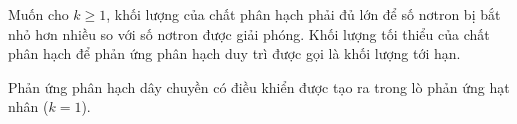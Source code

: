Muốn cho $k \geq 1$, khối lượng của chất phân hạch phải đủ lớn để số nơtron bị bắt nhỏ hơn nhiều so với số nơtron được giải phóng. Khối lượng tối thiểu của chất phân hạch để phản ứng phân hạch duy trì được gọi là khối lượng tới hạn.

Phản ứng phân hạch dây chuyền có điều khiển được tạo ra trong lò phản ứng hạt nhân ($k=1$).